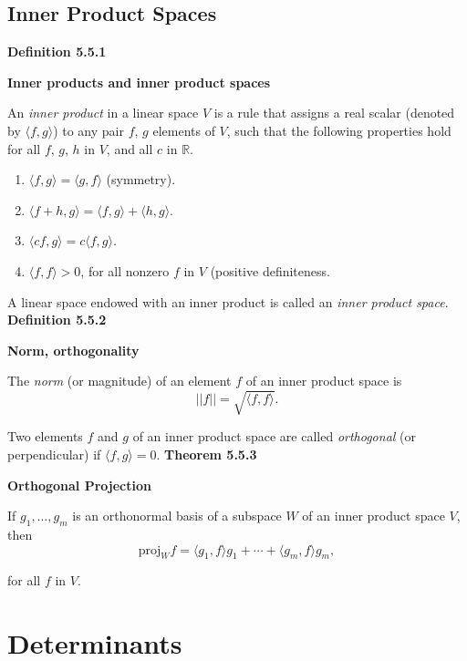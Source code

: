 \subsection{Inner Product Spaces}
\textbf{Definition 5.5.1}\\
\par\noindent\textbf{Inner products and inner product spaces}
\par\noindent An \textit{inner product} in a linear space $V$ is a rule that assigns a real scalar (denoted by $\langle{}f,g\rangle{}$) to any pair $f$, $g$ elements of $V$, such that the following properties hold for all $f$, $g$, $h$ in $V$, and all $c$ in $\mathbb{R}$.
\renewcommand{\labelenumi}{\textbf{\alph{enumi}.}}
\begin{enumerate}
\item $\langle{}f,g\rangle{}=\langle{}g,f\rangle{}$ (symmetry).
\item $\langle{}f+h,g\rangle{}=\langle{}f,g\rangle{}+\langle{}h,g\rangle{}$.
\item $\langle{}cf,g\rangle{}=c\langle{}f,g\rangle{}$.
\item $\langle{}f,f\rangle{}>0$, for all nonzero $f$ in $V$ (positive definiteness.
\end{enumerate}
\par\noindent A linear space endowed with an inner product is called an \textit{inner product space}.
\textbf{Definition 5.5.2}\\
\par\noindent\textbf{Norm, orthogonality}
\par\noindent The \textit{norm} (or magnitude) of an element $f$ of an inner product space is
\[||f||=\sqrt{\langle{}f,f\rangle{}}.\]
\par\noindent Two elements $f$ and $g$ of an inner product space are called \textit{orthogonal} (or perpendicular) if $\langle{}f,g\rangle{}=0$.
\textbf{Theorem 5.5.3}\\
\par\noindent\textbf{Orthogonal Projection}
\par\noindent If $g_{1},\ldots{},g_{m}$ is an orthonormal basis of a subspace $W$ of an inner product space $V$, then
\[\textrm{proj}_{W}f=\langle{}g_{1},f\rangle{}g_{1}+\cdots{}+\langle{}g_{m},f\rangle{}g_{m},\]
\par\noindent for all $f$ in $V$.


\section{Determinants}

